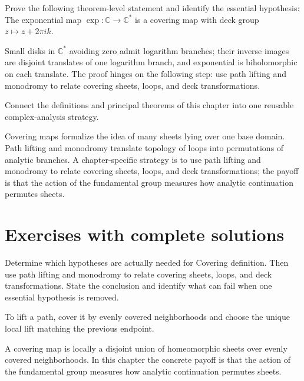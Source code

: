 \begin{problem}\label{prob:iv23-problem-11}
Prove the following theorem-level statement and identify the essential hypothesis: The exponential map $\exp:\mathbb C\to\mathbb C^*$ is a covering map with deck group $z\mapsto z+2\pi i k$.
\end{problem}
\begin{solution}
Small disks in $\mathbb C^*$ avoiding zero admit logarithm branches; their inverse images are disjoint translates of one logarithm branch, and exponential is biholomorphic on each translate. The proof hinges on the following step: use path lifting and monodromy to relate covering sheets, loops, and deck transformations.
\end{solution}

\begin{problem}\label{prob:iv23-problem-12}
Connect the definitions and principal theorems of this chapter into one reusable complex-analysis strategy.
\end{problem}
\begin{solution}
Covering maps formalize the idea of many sheets lying over one base domain. Path lifting and monodromy translate topology of loops into permutations of analytic branches. A chapter-specific strategy is to use path lifting and monodromy to relate covering sheets, loops, and deck transformations; the payoff is that the action of the fundamental group measures how analytic continuation permutes sheets.
\end{solution}

\section{Exercises with complete solutions}

\begin{exercise}\label{exr:iv23-01}
Determine which hypotheses are actually needed for Covering definition. Then use path lifting and monodromy to relate covering sheets, loops, and deck transformations. State the conclusion and identify what can fail when one essential hypothesis is removed.
\end{exercise}
\begin{hint}
To lift a path, cover it by evenly covered neighborhoods and choose the unique local lift matching the previous endpoint.
\end{hint}
\begin{solution}
A covering map is locally a disjoint union of homeomorphic sheets over evenly covered neighborhoods. In this chapter the concrete payoff is that the action of the fundamental group measures how analytic continuation permutes sheets.
\end{solution}

